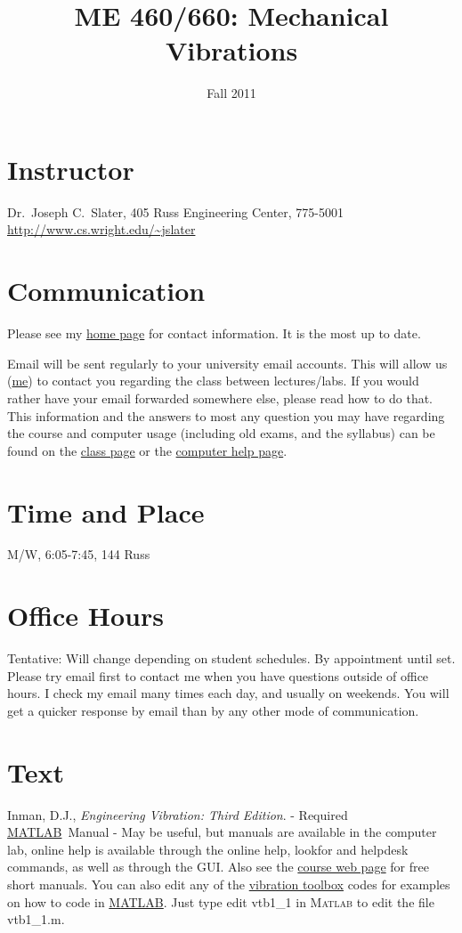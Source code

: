 \documentclass[10pt]{article}
\title{ME 460/660: Mechanical Vibrations}
\date{Fall 2011}%
\author{}
\newcommand{\comp}[1]{{{\small\textsf{#1}}}}
\newcommand{\matlab}{\href{http://www.mathworks.com}{M{\small ATLAB}}}
\begin{document}
\maketitle

\section{Instructor}
Dr.~Joseph C.~Slater, 405 Russ Engineering Center, 775-5001\\
\href{http://www.cs.wright.edu/~jslater}{\url{http://www.cs.wright.edu/~jslater}}

\section{Communication}
Please see my \href{http://www.cs.wright.edu/~jslater}{home page} for contact information. It is the most up to date. 

 Email will be sent regularly to your university email accounts.  This will allow us (\href{http://www.cs.wright.edu/~jslater}{me}) to contact you regarding the class between lectures/labs.  If you would rather have your email forwarded somewhere else, please read how to do that.  This information and the answers to most any question you may have regarding the course and computer usage (including old exams, and the syllabus) can be found on the \href{http://www.cs.wright.edu/~jslater/classes/vibration}{class  page} or the \href{http://www.cs.wright.edu/~jslater/classes/computerhelp.shtml}{computer help page}.


\section{Time and Place}
M/W, 6:05-7:45, 144 Russ

\section{Office Hours}
Tentative: Will change depending on student schedules. By appointment until set. Please try email first to contact me when you have questions outside of office hours.  I check my email many times each day, and usually on weekends. You will get a quicker response by email than by any other mode of communication.

\section{Text}
Inman, D.J., \textit{Engineering Vibration: Third Edition}.  - Required\\
\matlab\  Manual - May be useful, but manuals are available in 
the computer lab, online help is available through the online \comp{help}, 
\comp{lookfor} and \comp{helpdesk} commands, as well as through the GUI. Also see the \href{http://www.cs.wright.edu/\~jslater/classes/vibration.html}{course web page} for free short manuals. You can also edit any of the \href{http://www.cs.wright.edu/vtoolbox}{vibration toolbox} codes for examples on how to code in \matlab. Just type \comp{edit vtb1\_1} in \textsc{Matlab} to edit the file \comp{vtb1\_1.m}. 
\end{document}
